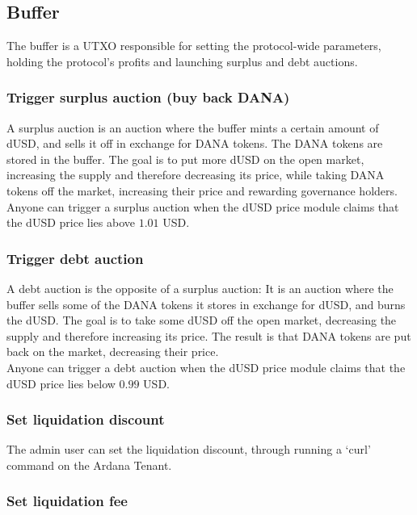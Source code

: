 \documentclass{article} %
\begin{document}
\subsection{Buffer}

The buffer is a UTXO responsible for setting the protocol-wide parameters,
holding the protocol's profits and launching surplus and debt auctions.

\subsubsection{Trigger surplus auction (buy back DANA)}

A surplus auction is an auction where the buffer mints a certain amount of dUSD,
and sells it off in exchange for DANA tokens.
The DANA tokens are stored in the buffer.
The goal is to put more dUSD on the open market, increasing the supply and
therefore decreasing its price, while taking DANA tokens off the market,
increasing their price and rewarding governance holders. \\

Anyone can trigger a surplus auction when the dUSD price module claims that the
dUSD price lies above $1.01$ USD.

\subsubsection{Trigger debt auction}

A debt auction is the opposite of a surplus auction:
It is an auction where the buffer sells some of the DANA tokens it stores in
exchange for dUSD, and burns the dUSD.
The goal is to take some dUSD off the open market, decreasing the supply and
therefore increasing its price.
The result is that DANA tokens are put back on the market, decreasing their
price. \\

Anyone can trigger a debt auction when the dUSD price module claims that the
dUSD price lies below $0.99$ USD.

\subsubsection{Set liquidation discount}

The admin user can set the liquidation discount, through running a `curl'
command on the Ardana Tenant.

\subsubsection{Set liquidation fee}
\end{document}
